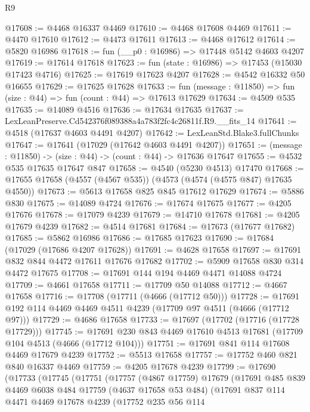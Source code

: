 \begin{lexlean}{R9}
\begin{coremodule}
@17608 := @4468 @16337 @4469
@17610 := @4468 @17608 @4469
@17611 := @4470 @17610
@17612 := @4473 @17611
@17613 := @4468 @17612
@17614 := @5820 @16986
@17618 := fun (__p0 : @16986) => @17448 @5142 @4603 @4207
@17619 := @17614 @17618
@17623 := fun (state : @16986) => @17453 (@15030 @17423 @4716)
@17625 := @17619 @17623 @4207
@17628 := @4542 @16332 @50 @16655
@17629 := @17625 @17628
@17633 := fun (message : @11850) => fun (size : @44) => fun (count : @44) => @17613 @17629
@17634 := @4509 @535
@17635 := @14089 @4516
@17636 := @17634 @17635
@17637 := LexLeanPreserve.Cd542376f089388a4a783f2fc4c26811f.R9.__fits_14
@17641 := @4518 (@17637 @4603 @4491 @4207)
@17642 := LexLeanStd.Blake3.fullChunks
@17647 := @17641 (@17029 (@17642 @4603 @4491 @4207))
@17651 := (message : @11850) -> (size : @44) -> (count : @44) -> @17636 @17647
@17655 := @4532 @535 @17635 @17647 @847
@17658 := @4540 (@5230 @4513) @17470
@17668 := @17655 @17658 (@4557 (@4567 @535)) (@4573 (@4574 (@4575 @847) @17635 @4550))
@17673 := @5613 @17658 @825 @845 @17612 @17629
@17674 := @5886 @830
@17675 := @14089 @4724
@17676 := @17674 @17675
@17677 := @4205 @17676
@17678 := @17079 @4239
@17679 := @14710 @17678
@17681 := @4205 @17679 @4239
@17682 := @4514 @17681
@17684 := @17673 (@17677 @17682)
@17685 := @5862 @16986
@17686 := @17685 @17623
@17690 := @17684 (@17029 (@17686 @4207 @17628))
@17691 := @4628 @17658
@17697 := @17691 @832 @844 @4472 @17611 @17676 @17682
@17702 := @5909 @17658 @830 @314 @4472 @17675
@17708 := @17691 @144 @194 @4469 @4471 @14088 @4724
@17709 := @4661 @17658
@17711 := @17709 @50 @14088
@17712 := @4667 @17658
@17716 := @17708 (@17711 (@4666 (@17712 @50)))
@17728 := @17691 @192 @114 @4469 @4469 @4511 @4239 (@17709 @97 @4511 (@4666 (@17712 @97)))
@17729 := @4686 @17658
@17733 := @17697 (@17702 (@17716 (@17728 @17729)))
@17745 := @17691 @230 @843 @4469 @17610 @4513 @17681 (@17709 @104 @4513 (@4666 (@17712 @104)))
@17751 := @17691 @841 @114 @17608 @4469 @17679 @4239
@17752 := @5513 @17658
@17757 := @17752 @460 @821 @840 @16337 @4469
@17759 := @4205 @17678 @4239
@17799 := @17690
    (@17733
      (@17745
        (@17751
          (@17757
            (@4867 @17759)
            @17679
            (@17691
              @485
              @839
              @4469
              @6038
              @484
              @17759
              (@4637 @17658 @53 @484)
              (@17691
                @837
                @114
                @4471
                @4469
                @17678
                @4239
                (@17752
                  @235
                  @56
                  @114

\end{coremodule}
\end{lexlean}

